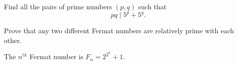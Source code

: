 \documentclass{subfile}
\begin{document}
	\begin{problem}[China 2009]
		Find all the pairs of prime numbers $ (p,q)$ such that $$ pq \mid 5^p+5^q.$$ %
	\end{problem}


	\begin{problem}
		Prove that any two different Fermat numbers are relatively prime with each other.
	\end{problem}

	\begin{note}
		The $n^{th}$ Fermat number is $F_n = 2^{2^n} + 1$.
	\end{note}

\end{document}
